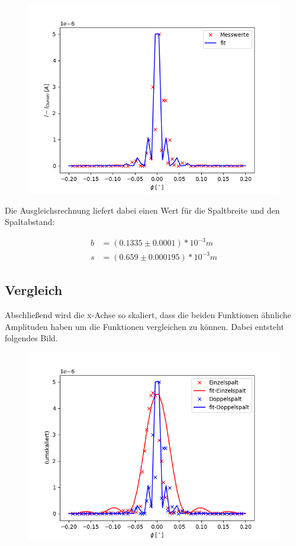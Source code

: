 \begin{figure}[H]
    \centering
    \includegraphics{doppel.png}
\end{figure}

Die Ausgleichsrechnung liefert dabei einen Wert für die Spaltbreite und den Spaltabstand:

\begin{align*}
    b &= (0.1335\pm 0.0001)* 10^{-3}m \\
    s &= (0.659\pm 0.000195)* 10^{-3}m  
\end{align*}

\subsection{Vergleich}

Abschließend wird die x-Achse so skaliert, dass die beiden Funktionen ähnliche Amplituden haben um die Funktionen vergleichen zu können. Dabei entsteht folgendes Bild.

\begin{figure}[H]
    \centering
    \includegraphics{vergleich.png}
\end{figure}


